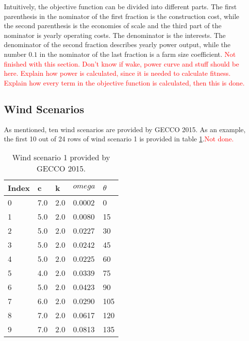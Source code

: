 \noindent Intuitively, the objective function can be divided into different parts. The first parenthesis in the nominator of the first fraction is the construction cost, while the second parenthesis is the economies of scale and the third part of the nominator is yearly operating costs. The denominator is the interests. The denominator of the second fraction describes yearly power output, while the number $0.1$ in the nominator of the last fraction is a farm size coefficient. \textcolor{red}{Not finished with this section. Don't know if wake, power curve and stuff should be here. Explain how power is calculated, since it is needed to calculate fitness.} \textcolor{red}{Explain how every term in the objective function is calculated, then this is done.}\\



\subsection{Wind Scenarios}


As mentioned, ten wind scenarios are provided by GECCO 2015. As an example, the first 10 out of 24 rows of wind scenario 1 is provided in table \ref{Wind scenario 1}.\textcolor{red}{Not done.}


\begin{table}[h!]
\begin{center}
\caption{Wind scenario 1 provided by GECCO 2015.}
\label{Wind scenario 1}
\begin{tabular}{l|l|l|l|l}
\textbf{Index} & \textbf{c} & \textbf{k} & \textbf{$omega$} & \textbf{$\theta$} \\ 
\hline
0 & 7.0 & 2.0 & 0.0002 & 0 \\  
1 & 5.0 & 2.0 & 0.0080 & 15 \\ 
2 & 5.0 & 2.0 & 0.0227 & 30 \\ 
3 & 5.0 & 2.0 & 0.0242 & 45 \\ 
4 & 5.0 & 2.0 & 0.0225 & 60 \\ 
5 & 4.0 & 2.0 & 0.0339 & 75 \\ 
6 & 5.0 & 2.0 & 0.0423 & 90 \\ 
7 & 6.0 & 2.0 & 0.0290 & 105 \\ 
8 & 7.0 & 2.0 & 0.0617 & 120 \\ 
9 & 7.0 & 2.0 & 0.0813 & 135 \\ 
\end{tabular} 
\end{center}
\end{table}


